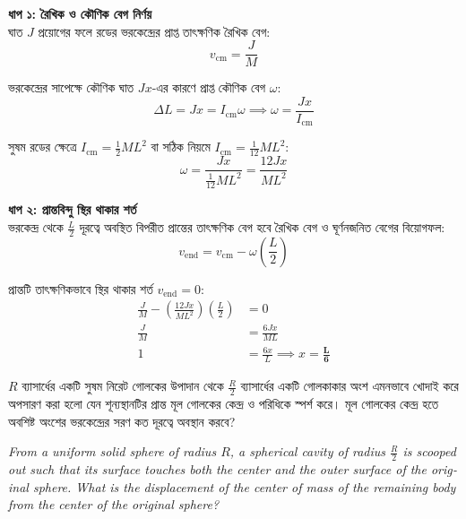 \documentclass[12pt, a4paper]{article}
\begin{document}
\begin{tcolorbox}[solutionbox={সমাধান (Solution)}]
    \noindent
    \textbf{ধাপ ১: রৈখিক ও কৌণিক বেগ নির্ণয়} \\
    ঘাত $J$ প্রয়োগের ফলে রডের ভরকেন্দ্রের প্রাপ্ত তাৎক্ষণিক রৈখিক বেগ:
    \[ v_{\text{cm}} = \frac{J}{M} \]
    
    ভরকেন্দ্রের সাপেক্ষে কৌণিক ঘাত $J x$-এর কারণে প্রাপ্ত কৌণিক বেগ $\omega$:
    \[ \Delta L = J x = I_{\text{cm}} \omega \implies \omega = \frac{J x}{I_{\text{cm}}} \]
    
    সুষম রডের ক্ষেত্রে $I_{\text{cm}} = \frac{1}{2} M L^2$ বা সঠিক নিয়মে $I_{\text{cm}} = \frac{1}{12} M L^2$:
    \[ \omega = \frac{J x}{\frac{1}{12} M L^2} = \frac{12 J x}{M L^2} \]
    
    \vspace{0.5em}
    \noindent\textbf{ধাপ ২: প্রান্তবিন্দু স্থির থাকার শর্ত} \\
    ভরকেন্দ্র থেকে $\frac{L}{2}$ দূরত্বে অবস্থিত বিপরীত প্রান্তের তাৎক্ষণিক বেগ হবে রৈখিক বেগ ও ঘূর্ণনজনিত বেগের বিয়োগফল:
    \[ v_{\text{end}} = v_{\text{cm}} - \omega \left(\frac{L}{2}\right) \]
    
    প্রান্তটি তাৎক্ষণিকভাবে স্থির থাকার শর্ত $v_{\text{end}} = 0$:
    \begin{align*}
        \frac{J}{M} - \left(\frac{12 J x}{M L^2}\right) \left(\frac{L}{2}\right) &= 0 \\
        \frac{J}{M} &= \frac{6 J x}{M L} \\
        1 &= \frac{6x}{L} \implies x = \mathbf{\frac{L}{6}}
    \end{align*}
\end{tcolorbox}

\newpage

\begin{tcolorbox}[questionbox={প্রশ্ন (Question) 13}]
    \noindent
    $R$ ব্যাসার্ধের একটি সুষম নিরেট গোলকের উপাদান থেকে $\frac{R}{2}$ ব্যাসার্ধের একটি গোলকাকার অংশ এমনভাবে খোদাই করে অপসারণ করা হলো যেন শূন্যস্থানটির প্রান্ত মূল গোলকের কেন্দ্র ও পরিধিকে স্পর্শ করে। মূল গোলকের কেন্দ্র হতে অবশিষ্ট অংশের ভরকেন্দ্রের সরণ কত দূরত্বে অবস্থান করবে?
    
    \vspace{0.8em}
    \begin{english}
    \noindent\textit{\color{darkgray}
    From a uniform solid sphere of radius $R$, a spherical cavity of radius $\frac{R}{2}$ is scooped out such that its surface touches both the center and the outer surface of the original sphere. What is the displacement of the center of mass of the remaining body from the center of the original sphere?
    }
    \end{english}
\end{tcolorbox}
\end{document}
